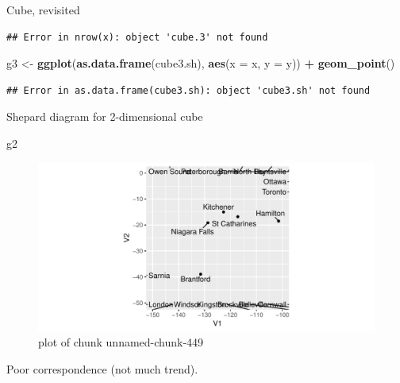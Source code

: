 \documentclass[ignorenonframetext,]{beamer}
\newenvironment{Shaded}{\begin{snugshade}}{\end{snugshade}}
\newcommand{\DataTypeTok}[1]{\textcolor[rgb]{0.13,0.29,0.53}{#1}}
\newcommand{\KeywordTok}[1]{\textcolor[rgb]{0.13,0.29,0.53}{\textbf{#1}}}
\newcommand{\NormalTok}[1]{#1}
\newcommand{\OperatorTok}[1]{\textcolor[rgb]{0.81,0.36,0.00}{\textbf{#1}}}
\newcommand{\StringTok}[1]{\textcolor[rgb]{0.31,0.60,0.02}{#1}}
\begin{document}
\begin{frame}[fragile]{Cube, revisited}
\begin{verbatim}
## Error in nrow(x): object 'cube.3' not found
\end{verbatim}

\begin{Shaded}
\begin{Highlighting}[]
\NormalTok{g3 <-}\StringTok{ }\KeywordTok{ggplot}\NormalTok{(}\KeywordTok{as.data.frame}\NormalTok{(cube3.sh), }\KeywordTok{aes}\NormalTok{(}\DataTypeTok{x =}\NormalTok{ x, }\DataTypeTok{y =}\NormalTok{ y)) }\OperatorTok{+}
\StringTok{  }\KeywordTok{geom_point}\NormalTok{()}
\end{Highlighting}
\end{Shaded}

\begin{verbatim}
## Error in as.data.frame(cube3.sh): object 'cube3.sh' not found
\end{verbatim}

\end{frame}

\begin{frame}[fragile]{Shepard diagram for 2-dimensional cube}
\protect\hypertarget{shepard-diagram-for-2-dimensional-cube}{}

\begin{Shaded}
\begin{Highlighting}[]
\NormalTok{g2}
\end{Highlighting}
\end{Shaded}

\begin{figure}
\centering
\includegraphics{figure/unnamed-chunk-449-1.pdf}
\caption{plot of chunk unnamed-chunk-449}
\end{figure}

Poor correspondence (not much trend).

\end{frame}
\end{document}
